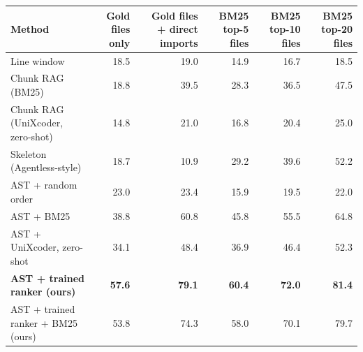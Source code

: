 \begin{tabular}{lrrrrr}
\toprule
Method & Gold files only & Gold files + direct imports & BM25 top-5 files & BM25 top-10 files & BM25 top-20 files \\
\midrule
Line window & 18.5 & 19.0 & 14.9 & 16.7 & 18.5 \\
Chunk RAG (BM25) & 18.8 & 39.5 & 28.3 & 36.5 & 47.5 \\
Chunk RAG (UniXcoder, zero-shot) & 14.8 & 21.0 & 16.8 & 20.4 & 25.0 \\
Skeleton (Agentless-style) & 18.7 & 10.9 & 29.2 & 39.6 & 52.2 \\
AST + random order & 23.0 & 23.4 & 15.9 & 19.5 & 22.0 \\
AST + BM25 & 38.8 & 60.8 & 45.8 & 55.5 & 64.8 \\
AST + UniXcoder, zero-shot & 34.1 & 48.4 & 36.9 & 46.4 & 52.3 \\
\textbf{AST + trained ranker (ours)} & \textbf{57.6} & \textbf{79.1} & \textbf{60.4} & \textbf{72.0} & \textbf{81.4} \\
AST + trained ranker + BM25 (ours) & 53.8 & 74.3 & 58.0 & 70.1 & 79.7 \\
\bottomrule
\end{tabular}
